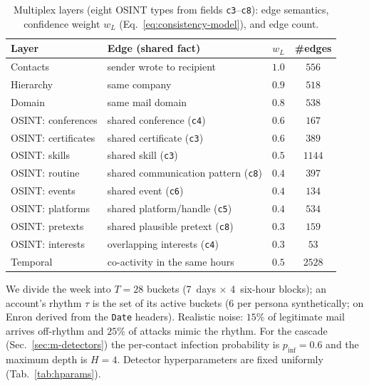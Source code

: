 \begin{table}[h]\centering\small
\begin{tabular}{llcc}
\toprule
\textbf{Layer} & \textbf{Edge (shared fact)} & \textbf{$w_L$} & \textbf{\#edges} \\
\midrule
Contacts & sender wrote to recipient & $1.0$ & $556$ \\
Hierarchy & same company & $0.9$ & $518$ \\
Domain & same mail domain & $0.8$ & $538$ \\
OSINT: conferences & shared conference (\texttt{c4}) & $0.6$ & $167$ \\
OSINT: certificates & shared certificate (\texttt{c3}) & $0.6$ & $389$ \\
OSINT: skills & shared skill (\texttt{c3}) & $0.5$ & $1144$ \\
OSINT: routine & shared communication pattern (\texttt{c8}) & $0.4$ & $397$ \\
OSINT: events & shared event (\texttt{c6}) & $0.4$ & $134$ \\
OSINT: platforms & shared platform/handle (\texttt{c5}) & $0.4$ & $534$ \\
OSINT: pretexts & shared plausible pretext (\texttt{c8}) & $0.3$ & $159$ \\
OSINT: interests & overlapping interests (\texttt{c4}) & $0.3$ & $53$ \\
Temporal & co-activity in the same hours & $0.5$ & $2528$ \\
\bottomrule
\end{tabular}
\caption{Multiplex layers (eight OSINT types from fields \texttt{c3}--\texttt{c8}): edge semantics, confidence
weight $w_L$ (Eq.~\eqref{eq:consistency-model}), and edge count.}
\label{tab:layers}
\end{table}

We divide the week into $T{=}28$ buckets
(7~days $\times$ 4~six-hour blocks); an account's rhythm $\tau$ is the set of its active buckets ($6$ per persona
synthetically; on Enron derived from the \texttt{Date} headers). Realistic noise: $15\%$ of legitimate mail
arrives off-rhythm and $25\%$ of attacks mimic the rhythm. For the cascade (Sec.~\ref{sec:m-detectors}) the
per-contact infection probability is $p_\mathrm{inf}{=}0.6$ and the maximum depth is $H{=}4$. Detector
hyperparameters are fixed uniformly (Tab.~\ref{tab:hparams}).

